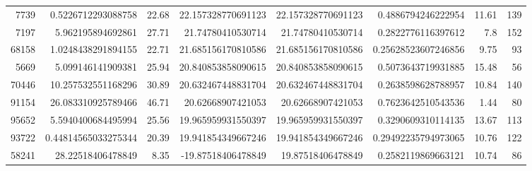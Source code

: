 \documentclass[14pt]{article} %
\begin{document}
\begin{landscape}
\begin{spacing}{1.0}
\begin{table}[h]
\begin{tabular}{|r|r|r|r|r|r|r|r|}
7739&0.5226712293088758&22.68&22.157328770691123&22.157328770691123&0.4886794246222954&11.61&139\\
7197&5.962195894692861&27.71&21.74780410530714&21.74780410530714&0.2822776116397612&7.8&152\\
68158&1.0248438291894155&22.71&21.685156170810586&21.685156170810586&0.25628523607246856&9.75&93\\
5669&5.099146141909381&25.94&20.840853858090615&20.840853858090615&0.5073643719931885&15.48&56\\
70446&10.257532551168296&30.89&20.632467448831704&20.632467448831704&0.2638598628788957&10.84&140\\
91154&26.083310925789466&46.71&20.62668907421053&20.62668907421053&0.7623642510543536&1.44&80\\
95652&5.5940400684495994&25.56&19.965959931550397&19.965959931550397&0.3290609310114135&13.67&113\\
93722&0.44814565033275344&20.39&19.941854349667246&19.941854349667246&0.29492235794973065&10.76&122\\
58241&28.22518406478849&8.35&-19.87518406478849&19.87518406478849&0.2582119869663121&10.74&86\\
\hline 
\end{tabular}
\end{table}

\newpage


\end{spacing}
\end{landscape}
\end{document}
